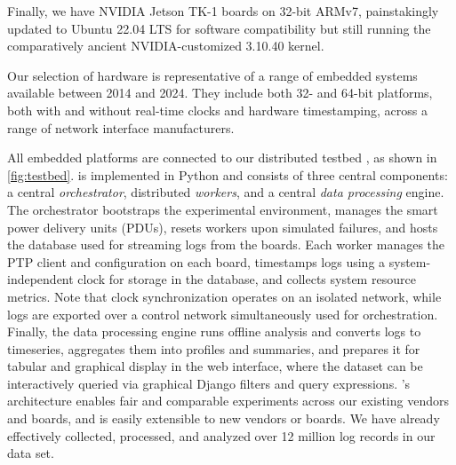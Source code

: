 Finally, we have NVIDIA Jetson TK-1 boards on 32-bit ARMv7,
painstakingly updated to Ubuntu 22.04 LTS for software compatibility but still
running the comparatively ancient NVIDIA-customized 3.10.40 kernel.

Our selection of hardware is representative
of a range of embedded systems available between 2014 and 2024.
They include both 32- and 64-bit platforms,
both with and without real-time clocks and hardware timestamping,
across a range of network interface manufacturers.

All embedded platforms are connected to our distributed testbed \toolName{},
as shown in \cref{fig:testbed}.
\toolName{} is implemented in Python and consists of three central components:
a central \textit{orchestrator}, distributed \textit{workers}, and a
central \textit{data processing} engine.
The orchestrator bootstraps the
experimental environment, manages the smart power delivery units (PDUs),
resets workers upon simulated failures,
and hosts the database used for streaming logs from the boards.
Each worker manages the PTP client and configuration on each board,
timestamps logs using a system-independent clock for storage in the database,
and collects system resource metrics.
Note that clock synchronization operates on an isolated network, while logs are
exported over a control network simultaneously used for orchestration.
Finally, the data processing engine runs offline analysis and converts logs to timeseries,
aggregates them into profiles and summaries, and prepares it for tabular and
graphical display in the \toolName{} web interface, where the dataset can be
interactively queried via graphical Django filters and query expressions.
\toolName{}'s architecture enables fair and comparable experiments across our
existing vendors and boards, and is easily extensible to new vendors or boards.
We have already effectively collected, processed, and analyzed over 12 million
log records in our data set.


